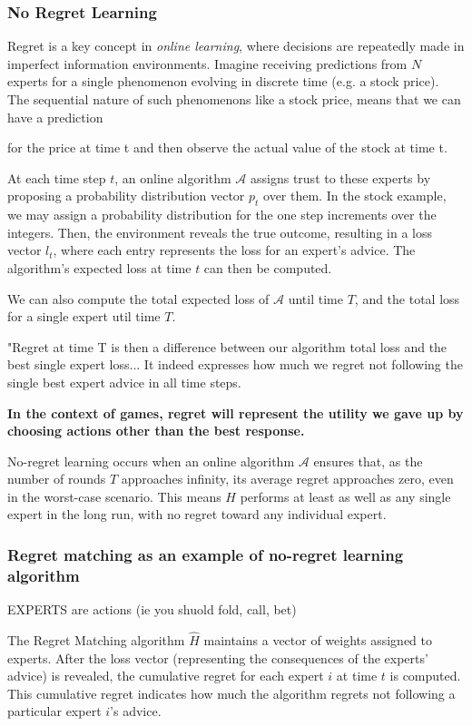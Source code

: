 \documentclass{article}
\begin{document}
\subsubsection{No Regret Learning}

Regret is a key concept in \textit{online learning}, where decisions are repeatedly made in imperfect information environments. Imagine receiving predictions from \( N \) experts for a single phenomenon evolving in discrete time (e.g. a stock price). The sequential nature of such phenomenons like a stock price, means that we can have a prediction

for the price at time t and then observe the actual value of the stock at time t. 

At each time step \( t \), an online algorithm \( \mathcal{A} \) assigns trust to these experts by proposing a probability distribution vector \( p_t \) over them. In the stock example, we may assign a probability distribution for the one step increments over the integers. 
Then, the environment reveals the true outcome, resulting in a loss vector \( l_t \), where each entry represents the loss for an expert's advice. The algorithm's expected loss at time $t$ can then be computed.

We can also compute the total expected loss of $\mathcal{A}$ until time $T$, and the total loss for a single expert util time $T$.

"Regret at time T is then a difference between our algorithm total loss and the best single expert loss... It indeed expresses how much we regret not following the single best expert advice in all time steps.

\textbf{In the context of games, regret will represent the utility we gave up by choosing actions other than the best response.}   

No-regret learning occurs when an online algorithm \( \mathcal{A} \) ensures that, as the number of rounds \( T \) approaches infinity, its average regret approaches zero, even in the worst-case scenario. This means \( H \) performs at least as well as any single expert in the long run, with no regret toward any individual expert.

\subsubsection{Regret matching as an example of no-regret learning algorithm}
EXPERTS are actions (ie you shuold fold, call, bet)

The Regret Matching algorithm \( \hat{H} \) maintains a vector of weights assigned to experts. After the loss vector (representing the consequences of the experts' advice) is revealed, the cumulative regret for each expert \( i \) at time \( t \) is computed. This cumulative regret indicates how much the algorithm regrets not following a particular expert \( i \)'s advice.
\end{document}
